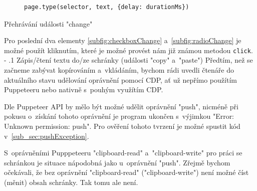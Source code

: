 \documentclass[12pt, a4paper, twoside]{article}
\makeatletter
\renewcommand\paragraph{%
	\@startsection{subparagraph}{5}{0mm}%
	{-\baselineskip}%
	{.1\baselineskip}%
	{\normalfont\normalsize\bfseries}}
\makeatother
\begin{document}
	\begin{codefigure}[H] \ContinuedFloat
		\begin{subfigure}[t]{\textwidth}
			\begin{lstlisting}[style=MyJavaScript]
page.type(selector, text, {delay: durationMs})
			\end{lstlisting}
			\caption{}
		\end{subfigure}
	\caption{Přehrávání události "change"}
	\end{codefigure}
	Pro poslední dva elementy \cref{subfig:checkboxChange} a~\ref{subfig:radioChange} je možné použít kliknutím, které je možné provést nám již známou metodou \texttt{click}. 
	\paragraph{Zápis/čtení textu do/ze schránky (události "copy" a~"paste")}
	Předtím, než se začneme zabývat kopírováním a~vkládáním, bychom rádi uvedli čtenáře do aktuálního stavu udělování oprávnění pomocí CDP, ať už nepřímo použítím Puppeteeru nebo nativně s~pouhým využítím CDP.
	
	Dle Puppeteer API by mělo být možné udělit oprávnění "push", nicméně při pokusu o~získání tohoto oprávnění je program ukončen s~výjimkou "Error: Unknown permission: push". Pro ověření tohoto tvrzení je možné spustit kód v~\ref{sub_sec:pushException}.
	
	S~oprávněními Pupppeteeru "clipboard-read" a~"clipboard-write" pro práci se schránkou je situace nápodobná jako u~oprávnění "push". Zřejmě bychom očekávali, že bez oprávnění "clipboard-read" ("clipboard-write") není možné číst (měnit) obsah schránky. Tak tomu ale není.
	
\end{document}
